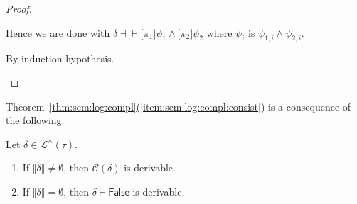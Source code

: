 \documentclass[%
  a4paper,
  UKenglish,
  cleveref,
  autoref,
  thm-restate,
  numberwithinsect,
]{lipics-v2021}
\newcommand\thesis{\vdash}
\newcommand\defthesisiff{\dashv\vdash}
\newcommand\thesisiff{\mathrel{\defthesisiff}}
\newcommand\I[1]{\llbracket #1 \rrbracket} %
\newcommand\C{\mathcal{C}}		%
\newcommand\temp[1]{\mathsf{#1}}
\newcommand\False{\temp{False}}
\newcommand\PT{\tau}		%
\newcommand\Lang{\mathcal{L}}
\newcommand\form[1]{\lbrack #1 \rbrack}
\begin{document}
\begin{proof}
\begin{description}
Hence we are done
with $\delta \thesisiff \form{\pi_1}\psi_1 \land \form{\pi_2}\psi_2$
where $\psi_i$ is $\psi_{1,i} \land \psi_{2,i}$.

\item[Item~(\ref{item:proof:sem:log:compl:nf:arrow}).]
By induction hypothesis.
\qedhere
\end{description}
\end{proof}

Theorem~\ref{thm:sem:log:compl}(\ref{item:sem:log:compl:consist})
is a consequence of the following.

\begin{lemma}
\label{lem:proof:sem:log:compl:c-false}
Let $\delta \in \Lang^\land(\PT)$.
\begin{enumerate}[(1)]
\item
\label{item:proof:sem:log:compl:c-false:c}
If $\I\delta \neq \emptyset$,
then $\C(\delta)$ is derivable.


\item
\label{item:proof:sem:log:compl:c-false:ded}
If $\I\delta = \emptyset$,
then $\delta \thesis \False$ is derivable.
\end{enumerate}
\end{lemma}
\end{document}
